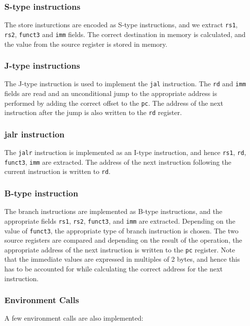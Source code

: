 \subsubsection{S-type instructions}
The store insturctions are encoded as S-type instructions, and we extract  \texttt{rs1}, \texttt{rs2}, \texttt{funct3} and \texttt{imm} fields. The correct destination in memory is calculated, and the value from the source register is stored in memory.

\subsubsection{J-type instructions}
The J-type instruction is used to implement the \texttt{jal} instruction. The \texttt{rd} and \texttt{imm} fields are read and an unconditional jump to the appropriate address is performed by adding the correct offset to the \texttt{pc}. The address of the next instruction after the jump is also written to the \texttt{rd} register.

\subsubsection{jalr instruction}
The \texttt{jalr} instruction is implemented as an I-type instruction, and hence \texttt{rs1}, \texttt{rd}, 
\texttt{funct3}, \texttt{imm} are extracted. The address of the next instruction following the current instruction is written to \texttt{rd}.

\subsubsection{B-type instruction}
The branch instructions are implemented as B-type instructions, and the appropriate fields \texttt{rs1}, \texttt{rs2}, \texttt{funct3}, and \texttt{imm} are extracted. Depending on the value of \texttt{funct3}, the appropriate type of branch instruction is chosen. The two source registers are compared and depending on the result of the operation, the appropriate address of the next instruction is written to the \texttt{pc} register. Note that the immediate values are expressed in multiples of 2 bytes, and hence this has to be accounted for while calculating the correct address for the next instruction.

\subsubsection{Environment Calls}
A few environment calls are also implemented:

